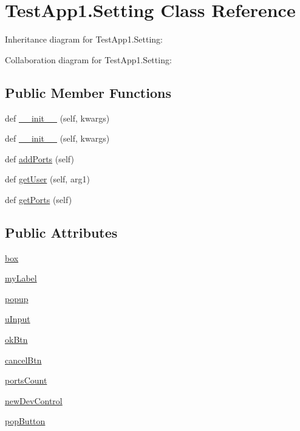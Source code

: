 \hypertarget{classTestApp1_1_1Setting}{}\section{Test\+App1.\+Setting Class Reference}
\label{classTestApp1_1_1Setting}


Inheritance diagram for Test\+App1.\+Setting\+:


Collaboration diagram for Test\+App1.\+Setting\+:
\subsection*{Public Member Functions}
\begin{DoxyCompactItemize}
\item 
def \hyperlink{classTestApp1_1_1Setting_a74bad58507816fbeaff1fc4179897de7}{\+\_\+\+\_\+init\+\_\+\+\_\+} (self, kwargs)
\item 
def \hyperlink{classTestApp1_1_1Setting_a74bad58507816fbeaff1fc4179897de7}{\+\_\+\+\_\+init\+\_\+\+\_\+} (self, kwargs)
\item 
def \hyperlink{classTestApp1_1_1Setting_a93ff4a112c0ea2d7fbb741294fbe84e4}{add\+Ports} (self)
\item 
def \hyperlink{classTestApp1_1_1Setting_af372ec2bb98248f237bc11e3b789966f}{get\+User} (self, arg1)
\item 
def \hyperlink{classTestApp1_1_1Setting_ace2d3903967a735e697a106e65e91ef9}{get\+Ports} (self)
\end{DoxyCompactItemize}
\subsection*{Public Attributes}
\begin{DoxyCompactItemize}
\item 
\hyperlink{classTestApp1_1_1Setting_a6ab674569a4ad3d7421177f2986602db}{box}
\item 
\hyperlink{classTestApp1_1_1Setting_a9a61551e68453758f35318ab3d816697}{my\+Label}
\item 
\hyperlink{classTestApp1_1_1Setting_a81e1c9b44e01ada3511d867f4e82dd1b}{popup}
\item 
\hyperlink{classTestApp1_1_1Setting_afc9d6674bdc5d0684fee6149b9c0f419}{u\+Input}
\item 
\hyperlink{classTestApp1_1_1Setting_a3649cafab30e4bb5d8b3adf394fe3f73}{ok\+Btn}
\item 
\hyperlink{classTestApp1_1_1Setting_ac670747147062929a8968061e1d6b3de}{cancel\+Btn}
\item 
\hyperlink{classTestApp1_1_1Setting_a2136b22973822bf1b2881f357439d362}{ports\+Count}
\item 
\hyperlink{classTestApp1_1_1Setting_aba15b6c9fc4651a8bfa9495b896873b0}{new\+Dev\+Control}
\item 
\hyperlink{classTestApp1_1_1Setting_a5bca6cb792372d9907922aad1f769eaa}{pop\+Button}
\end{DoxyCompactItemize}
